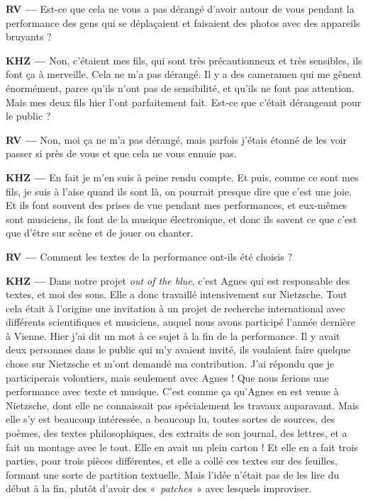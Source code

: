 \documentclass[a4paper,12pt]{article}
\newcommand{\guill}[1]{«~#1~»}
\begin{document}
\textbf{RV ---} Est-ce que cela ne vous a pas dérangé d'avoir autour de vous pendant la performance des gens qui se déplaçaient et faisaient des photos avec des appareils bruyants ?

\textbf{KHZ ---} Non, c'étaient mes fils, qui sont très précautionneux et très sensibles, ils font ça à merveille. Cela ne m'a pas dérangé. Il y a des cameramen qui me gênent énormément, parce qu'ils n'ont pas de sensibilité, et qu'ils ne font pas attention. Mais mes deux fils hier l'ont parfaitement fait. Est-ce que c'était dérangeant pour le public ?

\textbf{RV ---} Non, moi ça ne m'a pas dérangé, mais parfois j'étais étonné de les voir passer si près de vous et que cela ne vous ennuie pas.

\textbf{KHZ ---} En fait je m'en suis à peine rendu compte. Et puis, comme ce sont mes fils, je suis à l'aise quand ils sont là, on pourrait presque dire que c'est une joie. Et ils font souvent des prises de vue pendant mes performances, et eux-mêmes sont musiciens, ils font de la musique électronique, et donc ils savent ce que c'est que d'être sur scène et de jouer ou chanter.

\textbf{RV ---} Comment les textes de la performance ont-ils été choisis ?

\textbf{KHZ ---} Dans notre projet \emph{out of the blue}, c'est Agnes qui est responsable des textes, et moi des sons. Elle a donc travaillé intensivement sur Nietzsche. Tout cela était à l’origine une invitation à un projet de recherche international avec différents scientifiques et musiciens, auquel nous avons participé l'année dernière à Vienne. Hier j'ai dit un mot à ce sujet à la fin de la performance. Il y avait deux personnes dans le public qui m'y avaient invité, ils voulaient faire quelque chose sur Nietzsche et m'ont demandé ma contribution. J'ai répondu que je participerais volontiers, mais seulement avec Agnes ! Que nous ferions une performance avec texte et musique. C'est comme ça qu'Agnes en est venue à Nietzsche, dont elle ne connaissait pas spécialement les travaux auparavant. Mais elle s'y est beaucoup intéressée, a beaucoup lu, toutes sortes de sources, des poèmes, des textes philosophiques, des extraits de son journal, des lettres, et a fait un montage avec le tout. Elle en avait un plein carton ! Et elle en a fait trois parties, pour trois pièces différentes, et elle a collé ces textes sur des feuilles, formant une sorte de partition textuelle. Mais l'idée n'était pas de les lire du début à la fin, plutôt d'avoir des \guill{\emph{patches}} avec lesquels improviser.
\end{document}
